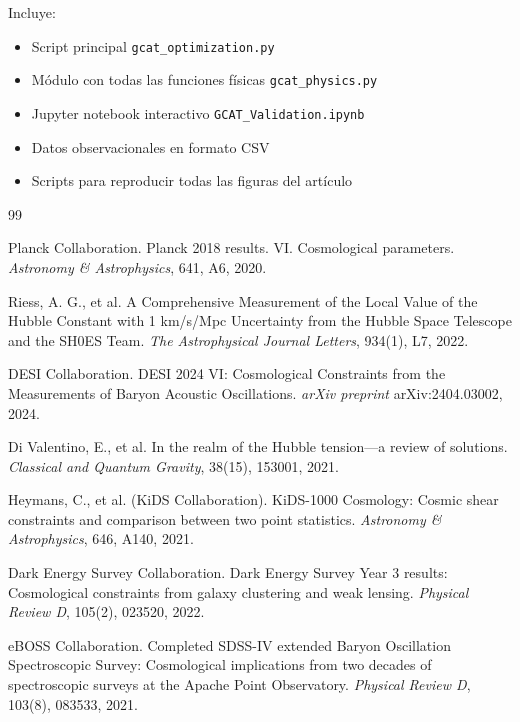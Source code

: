 \documentclass[12pt, a4paper]{article}
\theoremstyle{plain}
\theoremstyle{definition}
\begin{document}
Incluye:
\begin{itemize}
    \item Script principal \texttt{gcat\_optimization.py}
    \item Módulo con todas las funciones físicas \texttt{gcat\_physics.py}
    \item Jupyter notebook interactivo \texttt{GCAT\_Validation.ipynb}
    \item Datos observacionales en formato CSV
    \item Scripts para reproducir todas las figuras del artículo
\end{itemize}


\begin{thebibliography}{99}
\small

Planck Collaboration.
\newblock Planck 2018 results. VI. Cosmological parameters.
\newblock \textit{Astronomy \& Astrophysics}, 641, A6, 2020.

Riess, A. G., et al.
\newblock A Comprehensive Measurement of the Local Value of the Hubble Constant with 1 km/s/Mpc Uncertainty from the Hubble Space Telescope and the SH0ES Team.
\newblock \textit{The Astrophysical Journal Letters}, 934(1), L7, 2022.

DESI Collaboration.
\newblock DESI 2024 VI: Cosmological Constraints from the Measurements of Baryon Acoustic Oscillations.
\newblock \textit{arXiv preprint} arXiv:2404.03002, 2024.

Di Valentino, E., et al.
\newblock In the realm of the Hubble tension—a review of solutions.
\newblock \textit{Classical and Quantum Gravity}, 38(15), 153001, 2021.

Heymans, C., et al. (KiDS Collaboration).
\newblock KiDS-1000 Cosmology: Cosmic shear constraints and comparison between two point statistics.
\newblock \textit{Astronomy \& Astrophysics}, 646, A140, 2021.

Dark Energy Survey Collaboration.
\newblock Dark Energy Survey Year 3 results: Cosmological constraints from galaxy clustering and weak lensing.
\newblock \textit{Physical Review D}, 105(2), 023520, 2022.

eBOSS Collaboration.
\newblock Completed SDSS-IV extended Baryon Oscillation Spectroscopic Survey: Cosmological implications from two decades of spectroscopic surveys at the Apache Point Observatory.
\newblock \textit{Physical Review D}, 103(8), 083533, 2021.


\end{thebibliography}
\end{document}
